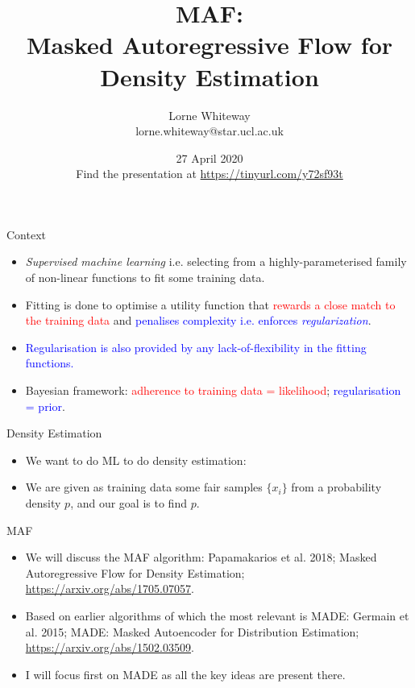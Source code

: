 \documentclass[usenames,dvipsnames]{beamer}
\title{MAF: \\ Masked Autoregressive Flow for Density Estimation}
\author{Lorne Whiteway \\ lorne.whiteway@star.ucl.ac.uk}
\institute{Astrophysics Group \\ Department of Physics and Astronomy \\ University College London}
\date{27 April 2020 \\ Find the presentation at \alert{\url{https://tinyurl.com/y72sf93t}}}
\begin{document}
\frame{\titlepage}

\begin{frame}{Context}
  \begin{block}{}
    \begin{itemize}
      \item{\textit{Supervised machine learning} i.e. selecting from a highly-parameterised family of non-linear functions to fit some training data.}
      \item{Fitting is done to optimise a utility function that \textcolor{red}{rewards a close match to the training data} and \textcolor{blue}{penalises complexity i.e. enforces \textit{regularization}}.}
      \item{\textcolor{blue}{Regularisation is also provided by any lack-of-flexibility in the fitting functions.}}
      \item{Bayesian framework: \textcolor{red}{adherence to training data = likelihood}; \textcolor{blue}{regularisation = prior}.}
    \end{itemize}
  \end{block}
\end{frame}

\begin{frame}{Density Estimation}
  \begin{block}{}
    \begin{itemize}
      \item{We want to do ML to do density estimation:}
      \item{We are given as training data some fair samples $\{x_i\}$ from a probability density $p$, and our goal is to find $p$.}
    \end{itemize}
  \end{block}
\end{frame}

\begin{frame}{MAF}
  \begin{block}{}
    \begin{itemize}
      \item{We will discuss the MAF algorithm: Papamakarios et al. 2018; Masked Autoregressive Flow for Density Estimation; \url{https://arxiv.org/abs/1705.07057}.}
      \item{Based on earlier algorithms of which the most relevant is MADE: Germain et al. 2015; MADE: Masked Autoencoder for Distribution Estimation; \url{https://arxiv.org/abs/1502.03509}.}
	\item{I will focus first on MADE as all the key ideas are present there.}
    \end{itemize}
  \end{block}
\end{frame}
\end{document}
